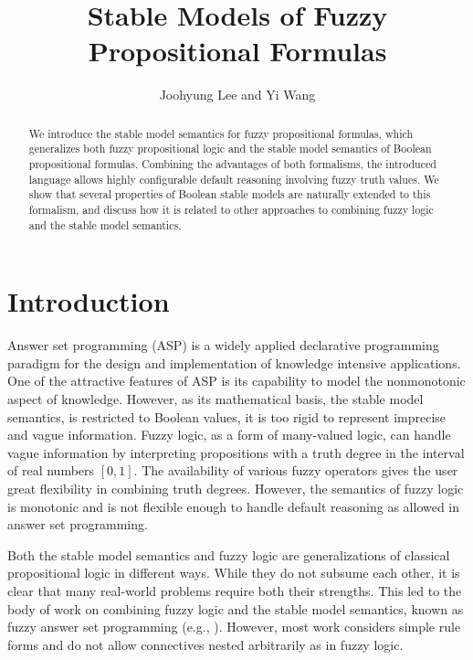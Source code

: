 \documentclass[runningheads]{llncs}
\title{Stable Models of Fuzzy Propositional Formulas}
\author{Joohyung Lee and Yi Wang}
\institute{
School of Computing, Informatics, and Decision Systems Engineering \\
Arizona State University, Tempe, USA \\
{\tt \{joolee,ywang485\}@asu.edu}}
\begin{document}
\maketitle



\begin{abstract}
We introduce the stable model semantics for fuzzy propositional
formulas, which generalizes both fuzzy propositional logic and the
stable model semantics of Boolean propositional formulas. 
Combining the advantages of both formalisms, the introduced
language allows highly configurable default reasoning involving fuzzy
truth values. We show that several properties of Boolean stable models
are naturally extended to this formalism, and discuss how it is related to other approaches to combining fuzzy logic and the stable model semantics. 
\end{abstract}

\section{Introduction} \label{sec:intro}

Answer set programming (ASP) \cite{lif08} is a widely applied
declarative programming paradigm for the design and implementation of
knowledge intensive applications. One of the attractive features of
ASP is its capability to model the nonmonotonic aspect of
knowledge. However, as its mathematical basis, the stable model
semantics, is restricted to Boolean values, it is too rigid to
represent imprecise and vague information. 
Fuzzy logic, as a form of many-valued logic,
can handle vague information by interpreting propositions with a truth
degree in the interval of real numbers $[0,1]$.
The availability of various fuzzy operators gives the user great
flexibility in combining truth degrees. However, the
semantics of fuzzy logic is monotonic and is not flexible enough to
handle default reasoning as allowed in answer set programming.

Both the stable model semantics and fuzzy logic are generalizations of
classical propositional logic in different ways. While they do not
subsume each other, it is clear that many real-world problems require
both their strengths. This led to the body of work on combining
fuzzy logic and the stable model semantics, known as fuzzy answer set
programming (e.g., \cite{lukasiewicz06fuzzy,janssen12reducing,vojtas01fuzzy,damasio01monotonic,medina01multi-adjoint,damasio01antitonic,nieuwenborgh07anintroduction,madrid08towards}).
However, most work considers simple rule forms and do not allow 
connectives nested arbitrarily as in fuzzy logic. 
\end{document}
